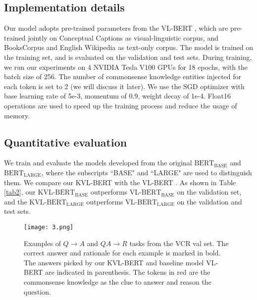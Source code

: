 \documentclass[conference]{IEEEtran}
\begin{document}
\subsection{Implementation details}
Our model adopts pre-trained parameters from the VL-BERT \cite{b14}, which are pre-trained jointly on Conceptual Captions \cite{b41} as visual-linguistic corpus, and BooksCorpus \cite{b42} and English Wikipedia as text-only corpus. The model is trained on the training set, and is evaluated on the validation and test sets. During training, we run our experiments on 4 NVIDIA Tesla V100 GPUs for 18 epochs, with the batch size of 256. The number of commonsense knowledge entities injected for each token is set to 2 (we will discuss it later). We use the SGD optimizer with base learning rate of 5e-3, momentum of 0.9, weight decay of 1e-4. Float16 operations are used to speed up the training process and reduce the usage of memory. 








\subsection{Quantitative evaluation}
We train and evaluate the models developed from the original $\mathrm{BERT}_{\mathrm{BASE}}$ and $\mathrm{BERT}_{\mathrm{LARGE}}$, where the subscripts “BASE" and “LARGE" are used to distinguish them. We compare our KVL-BERT with the VL-BERT  \cite{b14}. As shown in Table \ref{tab2}, our KVL-$\mathrm{BERT}_{\mathrm{BASE}}$ outperforms VL-$\mathrm{BERT}_{\mathrm{BASE}}$ on the validation set, and the KVL-$\mathrm{BERT}_{\mathrm{LARGE}}$ outperforms VL-$\mathrm{BERT}_{\mathrm{LARGE}}$ on the validation and test sets.



\begin{figure*}[htp]
  \centering
  \texttt{[image: 3.png]}\\
  \caption{Examples of  $Q \rightarrow A$ and $QA \rightarrow R$ tasks from the VCR val set. The correct answer and rationale for each example is marked in bold. The answers picked by our KVL-BERT and baseline model VL-BERT are indicated in parenthesis. The tokens in red are the commonsense knowledge as the clue to answer and reason the question.}
  \label{fig_case}
\end{figure*}
\end{document}
